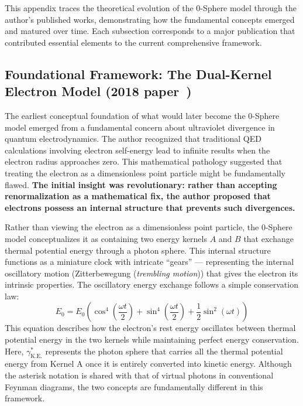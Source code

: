 \documentclass[%
 reprint,
 amsmath,amssymb,
 aps,
]{revtex4-1}
\numberwithin{equation}{section}%
\begin{document}
This appendix traces the theoretical evolution of the 0-Sphere model through the author's published works, demonstrating how the fundamental concepts emerged and matured over time. Each subsection corresponds to a major publication that contributed essential elements to the current comprehensive framework.

\subsection{Foundational Framework: The Dual-Kernel Electron Model (2018 paper~\cite{hanamura1811.0312})}

The earliest conceptual foundation of what would later become the 0-Sphere model emerged from a fundamental concern about ultraviolet divergence in quantum electrodynamics. The author recognized that traditional QED calculations involving electron self-energy lead to infinite results when the electron radius approaches zero. This mathematical pathology suggested that treating the electron as a dimensionless point particle might be fundamentally flawed. \textbf{The initial insight was revolutionary: rather than accepting renormalization as a mathematical fix, the author proposed that electrons possess an internal structure that prevents such divergences.}

Rather than viewing the electron as a dimensionless point particle, the 0-Sphere model conceptualizes it as containing two energy kernels $A$ and $B$ that exchange thermal potential energy through a photon sphere\cite{hanamura2018}. This internal structure functions as a miniature clock with intricate ``gears'' --- representing the internal oscillatory motion (Zitterbewegung (\textit{trembling motion})) that gives the electron its intrinsic properties\cite{schrodinger1930}. The oscillatory energy exchange follows a simple conservation law:
\begin{equation}
E_0 = E_0 \left( \cos^4 \left( \frac{\omega t}{2} \right) + \sin^4 \left( \frac{\omega t}{2} \right) + \frac{1}{2} \sin^2 (\omega t) \right)
\label{eq:energy_conservation}
\end{equation}
This equation describes how the electron's rest energy oscillates between thermal potential energy in the two kernels while maintaining perfect energy conservation. Here, $\gamma^*_{\mathrm{K.E.}}$ represents the photon sphere that carries all the thermal potential energy from Kernel A once it is entirely converted into kinetic energy. Although the asterisk notation is shared with that of virtual photons in conventional Feynman diagrams, the two concepts are fundamentally different in this framework.
\end{document}
